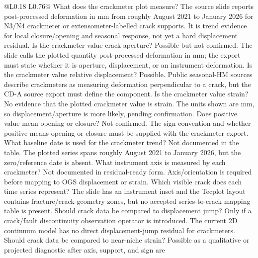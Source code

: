 \begin{longtable}{@{}L{0.18\textwidth} L{0.76\textwidth}@{}}
\toprule
{}
{ What does the crackmeter plot measure?}
{The source slide reports post-processed deformation in mm from roughly August
2021 to January 2026 for N3/N4 crackmeter or extensometer-labelled crack supports.
It is trend evidence for local closure/opening and seasonal response, not yet a
hard displacement residual.}
{ Is the crackmeter value crack aperture?}
{Possible but not confirmed.  The slide calls the plotted quantity post-processed
deformation in mm; the export must state whether it is aperture, displacement, or an
instrument deformation.}
{ Is the crackmeter value relative displacement?}
{Possible.  Public seasonal-HM sources describe crackmeters as measuring deformation
perpendicular to a crack, but the CD-A source export must define the component.}
{ Is the crackmeter value strain?}
{No evidence that the plotted crackmeter value is strain.  The units shown are mm,
so displacement/aperture is more likely, pending confirmation.}
{ Does positive value mean opening or closure?}
{Not confirmed.  The sign convention and whether positive means opening or closure
must be supplied with the crackmeter export.}
{ What baseline date is used for the crackmeter trend?}
{Not documented in the table.  The plotted series spans roughly August 2021 to
January 2026, but the zero/reference date is absent.}
{ What instrument axis is measured by each crackmeter?}
{Not documented in residual-ready form.  Axis/orientation is required before mapping
to OGS displacement or strain.}
{ Which visible crack does each time series represent?}
{The slide has an instrument inset and the Tecplot layout contains
fracture/crack-geometry zones, but no accepted series-to-crack mapping table is
present.}
{ Should crack data be compared to displacement jump?}
{Only if a crack/fault discontinuity observation operator is introduced.  The current
2D continuum model has no direct displacement-jump residual for crackmeters.}
{ Should crack data be compared to near-niche strain?}
{Possible as a qualitative or projected diagnostic after axis, support, and sign are
}
\end{longtable}
